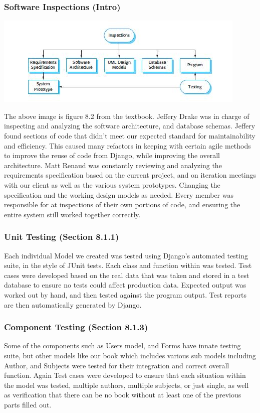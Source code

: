 \documentclass[11pt]{article}
\begin{document}
		\subsubsection{Software Inspections (Intro)}
			\centerline{\includegraphics[scale=0.75]{./images/inspections}} 
			The above image is figure 8.2 from the textbook. Jeffery Drake was in charge of inspecting and analyzing the software architecture, and database schemas. 
			Jeffery found sections of code that didn't meet our expected standard for maintainability and efficiency. 
			This caused many refactors in keeping with certain agile methods to improve the reuse of code from Django, while improving the overall architecture.  
			Matt Renaud was constantly reviewing and analyzing the requirements specification based on the current project, and on iteration meetings with our client as well as the various system prototypes. 
			Changing the specification and the working design models as needed. 
			Every member was responsible for at inspections of their own portions of code, and ensuring the entire system still worked together correctly.
		\subsubsection{Unit Testing (Section 8.1.1)}

			Each individual Model we created was tested using Django's automated testing suite, in the style of JUnit tests. 
			Each class and function within was tested. 
			Test cases were developed based on the real data that was taken and stored in a test database to ensure no tests could affect production data. 
			Expected output was worked out by hand, and then tested against the program output. 
			Test reports are then automatically generated by Django. 

		\subsubsection{Component Testing (Section 8.1.3)}

			Some of the components such as Users model, and Forms have innate testing suite, but other models like our book which includes various sub models including Author, and Subjects were tested for their integration and correct overall function. 
			Again Test cases were developed to ensure that each situation within the model was tested, multiple authors, multiple subjects, or just single, as well as verification that there can be no book without at least one of the previous parts filled out.
\end{document}
